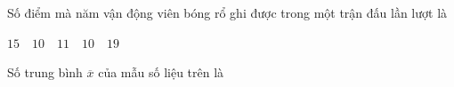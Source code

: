 \begin{ex}
Số điểm mà năm vận động viên bóng rổ ghi được trong một trận đấu lần lượt là
\begin{center}
$15 \quad 10 \quad 11 \quad 10 \quad 19$
\end{center}
Số trung bình $\overline x$ của mẫu số liệu trên là
\end{ex}

